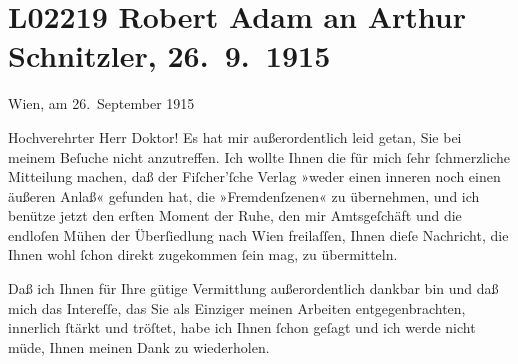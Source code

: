

\section[Robert Adam an Arthur Schnitzler, 26. 9. 1915]{L02219 Robert Adam an Arthur Schnitzler, 26. 9. 1915}
\nopagebreak{}
\rehead{ }\normalsize\beginnumbering{}
\toendnotes[C]{\smallbreak\pagebreak[2]}
\pstart
           \raggedleft{}{\pb}Wien, am 26. September 1915\pend
           
\pstart{}Hochverehrter Herr Doktor!\pend\vspace{0.5em}
\pstart
           Es hat mir außerordentlich leid getan, Sie bei meinem Beſuche nicht anzutreffen. Ich
               wollte Ihnen die für mich ſehr ſchmerzliche Mitteilung machen, daß der Fiſcher’ſche Verlag »weder einen inneren noch
               einen äußeren Anlaß« gefunden hat, die »Fremdenſzenen« zu übernehmen, und ich benütze jetzt den erſten Moment der
               Ruhe, den mir Amtsgeſchäft und die endloſen Mühen der Überſiedlung nach Wien freilaſſen, Ihnen dieſe Nachricht, die Ihnen
               wohl ſchon direkt zugekommen ſein mag, zu übermitteln.\pend
           
\pstart
           Daß ich Ihnen für Ihre gütige Vermittlung außerordentlich dankbar bin und daß mich
               das {\pb}Intereſſe, das Sie als Einziger meinen Arbeiten
               entgegenbrachten, innerlich ſtärkt und tröſtet, habe ich Ihnen ſchon geſagt und ich
               werde nicht müde, Ihnen meinen Dank zu wiederholen.\pend
           
